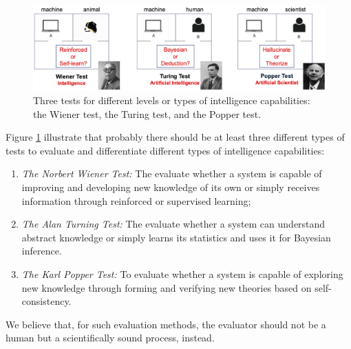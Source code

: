 \documentclass[../../book-main.tex]{subfiles}
\begin{document}
\begin{figure}[t]
    \centering
    \includegraphics[width=0.95\linewidth]{chapters/chapter8/figs/tests.png}
    \caption{Three tests for different levels or types of intelligence capabilities: the Wiener test, the Turing test, and the Popper test.}
    \label{fig:three-tests}
\end{figure}

Figure \ref{fig:three-tests} illustrate that probably there should be at least three different types of tests to evaluate and differentiate different types of intelligence capabilities:
\begin{enumerate}
    \item {\em The Norbert Wiener Test:} The evaluate whether a system is capable of improving and developing new knowledge of its own or simply receives information through reinforced or supervised learning;
    \item {\em The Alan Turning Test:} The evaluate whether a system can understand abstract knowledge or simply learns its statistics and uses it for Bayesian inference.
    \item {\em The Karl Popper Test:} To evaluate whether a system is capable of exploring new knowledge through forming and verifying new theories based on self-consistency.
\end{enumerate}
We believe that, for such evaluation methods, the evaluator should not be a human but a scientifically sound process, instead.
\end{document}
